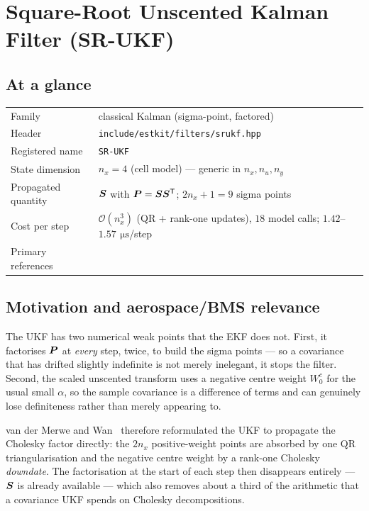 \chapter{Square-Root Unscented Kalman Filter (SR-UKF)}
\label{ch:srukf}

\section*{At a glance}
\begin{tabular}{@{}l>{\raggedright\arraybackslash}p{}@{}}
Family & classical Kalman (sigma-point, factored) \\
Header & \texttt{include/estkit/filters/srukf.hpp} \\
Registered name & \texttt{SR-UKF} \\
State dimension & $n_x = 4$ (cell model) --- generic in $n_x, n_u, n_y$ \\
Propagated quantity & $\bm{S}$ with $\bm{P} = \bm{S}\bm{S}^{\mathsf{T}}$; $2n_x+1 = 9$ sigma points \\
Cost per step & $\mathcal{O}(n_x^3)$ (QR + rank-one updates), $18$ model calls; $1.42$--$1.57\,\SI{}{\micro\second}$/step \\
Primary references & \cite{vandermerwe2001srukf,wan2000ukf,gillgolub1974,plett2006spkf1} \\
\end{tabular}

\section{Motivation and aerospace/BMS relevance}
The UKF has two numerical weak points that the EKF does not. First, it factorises $\bm{P}$ at
\emph{every} step, twice, to build the sigma points --- so a covariance that has drifted
slightly indefinite is not merely inelegant, it stops the filter. Second, the scaled unscented
transform uses a negative centre weight $W_0^c$ for the usual small $\alpha$, so the sample
covariance is a difference of terms and can genuinely lose definiteness rather than merely
appearing to.

van der Merwe and Wan~\cite{vandermerwe2001srukf} therefore reformulated the UKF to propagate
the Cholesky factor directly: the $2n_x$ positive-weight points are absorbed by one QR
triangularisation and the negative centre weight by a rank-one Cholesky \emph{downdate}. The
factorisation at the start of each step then disappears entirely --- $\bm{S}$ is already
available --- which also removes about a third of the arithmetic that a covariance UKF spends
on Cholesky decompositions.

